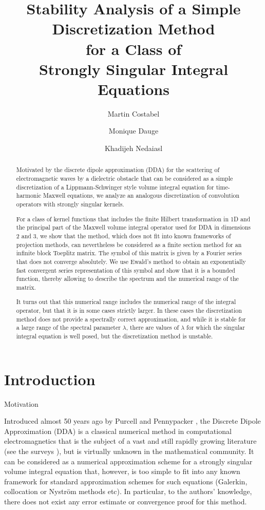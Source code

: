 \documentclass[12pt]{amsart}
\title[Stability of a Simple Discretization Method]{
Stability Analysis of a Simple Discretization Method\\ for a Class of \\Strongly Singular Integral Equations}
\author{Martin Costabel}
\author{Monique Dauge}
\author{Khadijeh Nedaiasl}
\makeatletter
\def\subsection{\@startsection{section}{1}%
  \z@{1.2\linespacing\@plus\linespacing}{.5\linespacing}%
  {\normalfont\scshape\centering}}
\def\subsection{\@startsection{subsection}{2}%
  \z@{0.9\linespacing\@plus.7\linespacing}{-.5em}%
  {\normalfont\bfseries}}
\theoremstyle{definition}
\theoremstyle{remark}
\numberwithin{equation}{section}
\makeatother
\begin{document}
\begin{abstract}
Motivated by the discrete dipole approximation (DDA) for the scattering of electromagnetic waves by a dielectric obstacle that can be considered as a simple discretization of a Lippmann-Schwinger style volume integral equation for time-harmonic Maxwell equations, we analyze an 
analogous discretization of convolution operators with strongly singular kernels. 

For a class of kernel functions that includes the finite Hilbert transformation in 1D and the principal part of the Maxwell volume integral operator used for DDA in dimensions 2 and 3, we show that the method, which does not fit into known frameworks of projection methods, can nevertheless be considered as a finite section method for an infinite block Toeplitz matrix. The symbol of this matrix is given by a Fourier series that does not converge absolutely. We use Ewald's method to obtain an exponentially fast convergent series representation of this symbol and show that it is a bounded function, thereby allowing to describe the spectrum and the numerical range of the matrix.

It turns out that this numerical range includes the numerical range of the integral operator, but that it is in some cases strictly larger. In these cases the discretization method does not provide a spectrally correct approximation, and while it is stable for a large range of the spectral parameter $\lambda$, there are values of $\lambda$ for which the singular integral equation is well posed, but the discretization method is unstable.  


\end{abstract}


\maketitle

\tableofcontents


\section{Introduction}\label{S:intro}

\subsection{Motivation}\label{SS:motiv}\ 

Introduced almost 50 years ago by Purcell and Pennypacker \cite{PurcellPennypacker1973}, the Discrete Dipole Approximation (DDA) is a classical numerical method in computational electromagnetics that is the subject of a vast and still rapidly growing literature (see the surveys \cite{YurkinHoekstra2007,Chaumet_M_22}), but is virtually unknown in the mathematical community. It can be considered as a numerical approximation scheme for a strongly singular volume integral equation that, however, is too simple to fit into any known framework for standard approximation schemes for such equations (Galerkin, collocation or Nystr\"om methods etc). In particular, to the authors' knowledge, there does not exist any error estimate or convergence proof for this method. 
\end{document}
